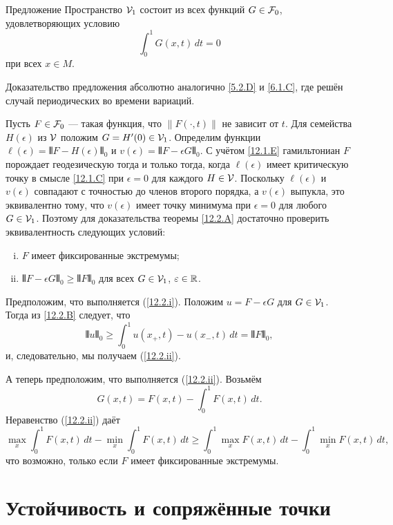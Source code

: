 \begin{thm}{Предложение}\label{12.2.B}
Пространство $\mathcal{V}_1$ состоит из всех функций $G\in\mathcal{F}_0$, удовлетворяющих условию
\[\int_0^1G(x,t)\,dt=0\]
при всех $x\in M$.
\end{thm}

Доказательство предложения абсолютно аналогично \ref{5.2.D} и \ref{6.1.C}, где решён случай периодических во времени вариаций.

Пусть $F\in\mathcal{F}_0$ — такая функция, что $\|F(\cdot, t)\|$ не зависит от $t$.
Для семейства $H(\epsilon)$ из $\mathcal{V}$ положим $G = H'(0)\in\mathcal{V}_1$.
Определим функции $\ell(\epsilon) = \VERT F - H(\epsilon)\VERT_0$ и $v(\epsilon) = \VERT F - \epsilon G\VERT_0$.
С учётом \ref{12.1.E} гамильтониан $F$ порождает геодезическую тогда и только тогда, когда $\ell(\epsilon)$ имеет критическую точку в смысле \ref{12.1.C} при $\epsilon= 0$ для каждого $H\in\mathcal{V}$.
Поскольку $\ell(\epsilon)$ и $v(\epsilon)$ совпадают с точностью до членов второго порядка, а $v(\epsilon)$ выпукла, это эквивалентно тому, что $v(\epsilon)$ имеет точку минимума при $\epsilon= 0$ для любого $G\in\mathcal{V}_1$.
Поэтому для доказательства теоремы \ref{12.2.A} достаточно проверить эквивалентность следующих условий:
\begin{enumerate}[(i)]
\item\label{12.2.i} $F$ имеет фиксированные экстремумы;
\item\label{12.2.ii} $\VERT F - \epsilon G\VERT_0 \ge \VERT F\VERT_0$ для всех $G\in\mathcal{V}_1$, $\varepsilon\in\mathbb{R}$.
\end{enumerate} 

Предположим, что выполняется (\ref{12.2.i}).
Положим 
$u=F-\epsilon G$ для $G\in \mathcal{V}_1$.
Тогда из \ref{12.2.B} следует, что 
\[\VERT u\VERT_0 \ge \int_0^1 u(x_+,t)-u(x_-,t)\,dt=\VERT F\VERT_0,\]
и, следовательно, мы получаем (\ref{12.2.ii}).

А теперь предположим, что выполняется (\ref{12.2.ii}).
Возьмём 
\[G(x, t) = F(x, t) - \int_0^1F(x,t)\,dt.\]
Неравенство (\ref{12.2.ii}) даёт 
\[
\max_x\!\int_0^1 F(x, t)\,dt- \min_x\!\int_0^1 F(x, t)\,dt
\ge
\int_0^1 \max_xF(x, t)\,dt-\! \int_0^1\min_x F(x, t)\,dt,
\]
что возможно, только если $F$ имеет фиксированные экстремумы.
\qeds


\section{Устойчивость и сопряжённые точки}

